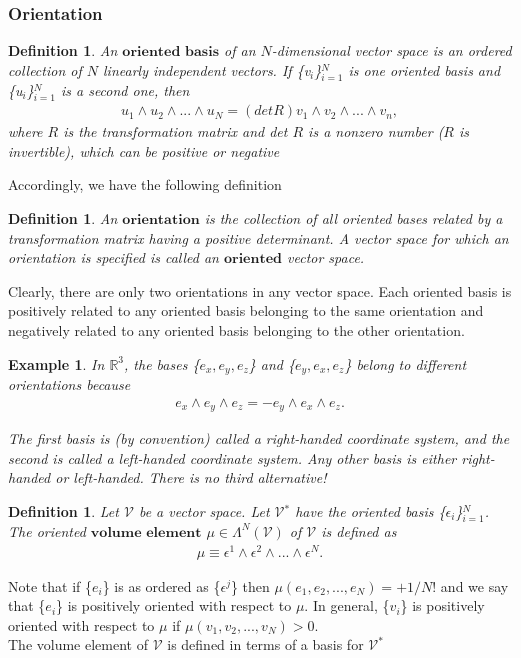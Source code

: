 \documentclass[12pt,a4paper]{article}
\newtheorem{defn}[thm]{Definition}
\newtheorem{exmp}{Example}[section]
\begin{document}
\subsubsection{Orientation}
\begin{defn}
An $\textbf{oriented basis}$ of an $N$-dimensional vector space is
an ordered collection of $N$ linearly independent vectors.
If \{v$_i$\}$^N_{i=1}$ is one oriented basis and \{u$_i$\}$^N_{i=1}$ is a second one, then\\
\begin{align*}
u_1 \wedge u_2 \wedge ... \wedge u_N = (det R)v_1 \wedge v_2 \wedge ... \wedge v_n,
\end{align*}
where $R$ is the transformation matrix and det $R$ is a nonzero number ($R$ is
invertible), which can be positive or negative
\end{defn}
 \indent Accordingly, we have the following definition
\begin{defn}
An $\textbf{orientation}$ is the collection of all oriented bases related by a transformation matrix having a positive determinant. A vector
space for which an orientation is specified is called an $\textbf{oriented}$ vector space.
\end{defn}
\indent Clearly, there are only two orientations in any vector space. Each oriented
basis is positively related to any oriented basis belonging to the same orientation and negatively related to any oriented basis belonging to the other
orientation. 
 \begin{exmp}
 In $\mathbb{R}^3$,  the bases \{$e_x, e_y, e_z$\} and \{$e_y, e_x, e_z$\} belong
to different orientations because
\begin{align*}
e_x \wedge e_y \wedge e_z = -e_y \wedge e_x \wedge e_z.
\end{align*}

The first basis is (by convention) called a right-handed coordinate system,
and the second is called a left-handed coordinate system. Any other basis
is either right-handed or left-handed. There is no third alternative!
\end{exmp}
\begin{defn}
Let $\mathcal{V}$ be a vector space. Let $\mathcal{V}$$^{*}$ have the oriented basis \{$\epsilon_i$\}$^N_{i=1}$. The oriented $\textbf{volume element}$ $\mu \in \Lambda^{N}(\mathcal{V})$ of $\mathcal{V}$ is defined as
\begin{align*}
\mu \equiv \epsilon^1 \wedge \epsilon^2 \wedge ... \wedge \epsilon^N.
\end{align*}
\end{defn}
\indent Note that if \{$e_i$\} is as ordered as \{$\epsilon^j$\} then $\mu( e_1, e_2, ... , e_N) = +1/N!$ and we say that \{$e_i$\} is positively oriented with respect to $\mu$. In general, \{$v_i$\}  is
positively oriented with respect to $\mu$ if $\mu(v_1, v_2, ... , v_N) > 0$. \\ The volume element of $\mathcal{V}$ is defined in terms of a basis for $\mathcal{V}^*$
\end{document}
